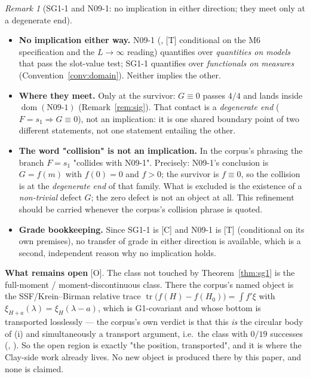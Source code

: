 \documentclass[11pt]{article}
\theoremstyle{definition}
\theoremstyle{remark}
\newtheorem{remark}[theorem]{Remark}
\newcommand{\code}[1]{\texttt{\footnotesize\detokenize{#1}}}
\newcommand{\grT}{\textsf{[T]}}
\newcommand{\grC}{\textsf{[C]}}
\newcommand{\grO}{\textsf{[O]}}
\begin{document}
\begin{remark}[SG1-1 and N09-1: no implication in either direction; they meet only at a degenerate end]\label{rem:n09rel}
\mbox{}
\begin{itemize}\itemsep1pt
\item \textbf{No implication either way.} N09-1
(\code{N09-RESTATE.md:44--53}, \grT{} conditional on the M6 specification and
the $L\to\infty$ reading) quantifies over \emph{quantities on models} that pass
the slot-value test; SG1-1 quantifies over \emph{functionals on measures}
(Convention~\ref{conv:domain}). Neither implies the other.
\item \textbf{Where they meet.} Only at the survivor: $G\equiv0$ passes $4/4$
and lands inside $\operatorname{dom}(\mathrm{N09\text{-}1})$
(Remark~\ref{rem:sig}). That contact is a \emph{degenerate end}
($F=s_1\Rightarrow G\equiv0$), not an implication: it is one shared boundary
point of two different statements, not one statement entailing the other.
\item \textbf{The word "collision" is not an implication.} In the corpus's
phrasing the branch $F=s_1$ "collides with N09-1". Precisely: N09-1's
conclusion is $G=f(m)$ with $f(0)=0$ and $f>0$; the survivor is $f\equiv0$, so
the collision is at the \emph{degenerate end} of that family. What is excluded
is the existence of a \emph{non-trivial} defect $G$; the zero defect is not an
object at all. This refinement should be carried whenever the corpus's
collision phrase is quoted.
\item \textbf{Grade bookkeeping.} Since SG1-1 is \grC{} and N09-1 is \grT{}
(conditional on its own premises), no transfer of grade in either direction is
available, which is a second, independent reason why no implication holds.
\end{itemize}
\end{remark}

\smallskip
\noindent\textbf{What remains open} \grO. The class not touched by
Theorem~\ref{thm:sg1} is the full-moment / moment-discontinuous class. There
the corpus's named object is the SSF/Krein--Birman relative trace
$\operatorname{tr}\bigl(f(H)-f(H_0)\bigr)=\int f'\xi$ with
$\xi_{H+a}(\lambda)=\xi_H(\lambda-a)$, which is G1-covariant and whose bottom is
transported losslessly --- the corpus's own verdict is that this \emph{is} the
circular body of (i) and simultaneously a transport argument, i.e.\ the class
with $0/19$ successes (\code{NS2.md:116}, \code{NS2.md:83}). So the open region
is exactly "the position, transported", and it is where the Clay-side work
already lives. No new object is produced there by this paper, and none is
claimed.
\end{document}
